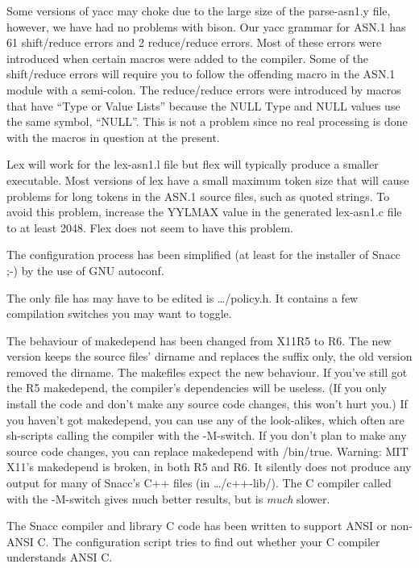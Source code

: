 Some versions of {\ufn yacc} may choke due to the large size of the
{\ufn parse-asn1.y} file, however, we have had no problems with {\ufn bison}.
Our {\ufn yacc} grammar for ASN.1 has 61 shift/reduce errors and 2
reduce/reduce errors.  Most of these errors were introduced when
certain macros were added to the compiler.  Some of the shift/reduce
errors will require you to follow the offending macro in the ASN.1
module with a semi-colon.  The reduce/reduce errors were introduced by
macros that have ``Type or Value Lists'' because the NULL Type and
NULL values use the same symbol, ``NULL''.  This is not a problem
since no real processing is done with the macros in question at the
present.

{\ufn Lex} will work for the {\ufn lex-asn1.l} file but {\ufn flex} will typically
produce a smaller executable.  Most versions of {\ufn lex} have a small
maximum token size that will cause problems for long tokens in the
ASN.1 source files, such as quoted strings.  To avoid this problem,
increase the {\C YYLMAX} value in the generated {\ufn lex-asn1.c} file to at least
2048.  {\ufn Flex} does not seem to have this problem.

The configuration process has been simplified (at least for the installer of Snacc ;-) by the use of GNU autoconf.

The only file has may have to be edited is {\ufn \dots/policy.h}.
It contains a few compilation switches you may want to toggle.

The behaviour of makedepend has been changed from X11R5 to R6.
The new version keeps the source files' dirname and replaces the suffix only, the old version removed the dirname.
The makefiles expect the new behaviour.
If you've still got the R5 makedepend, the compiler's dependencies will be useless.
(If you only install the code and don't make any source code changes, this won't hurt you.)
If you haven't got {\ufn makedepend}, you can use any of the look-alikes, which often are {\ufn sh}-scripts calling the compiler with the {\ufn -M}-switch.
If you don't plan to make any source code changes, you can replace {\ufn makedepend} with {\ufn /bin/true}.
\newline
Warning: MIT X11's makedepend is broken, in both R5 and R6.
It silently does not produce any output for many of Snacc's C++ files (in {\ufn \dots/c++-lib/}).
\newline
The C compiler called with the {\ufn -M}-switch gives much better results, but is \emph{much} slower.

The Snacc compiler and library C code has been written to support ANSI or non-ANSI C\@.
The configuration script tries to find out whether your C compiler understands ANSI C\@.


